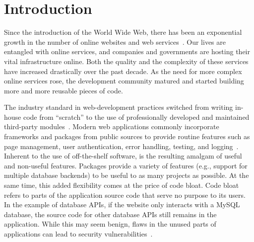 \section{Introduction}

Since the introduction of the World Wide Web, there has been an exponential growth in the number of online websites and web services~\cite{websitestatistics}. 
Our lives are entangled with online services, and companies and governments are hosting their vital infrastructure online. 
Both the quality and the complexity of these services have increased drastically over the past decade. 
As the need for more complex online services rose, the development community matured and started building more and more reusable pieces of code. 


The industry standard in web-development practices switched from writing in-house code from ``scratch'' to the use of professionally developed and maintained third-party modules~\cite{packagiststats, npmstatistics, pypi}. 
Modern web applications commonly incorporate frameworks and packages from public sources to provide routine features such as page management, user authentication, error handling, testing, and logging~\cite{popularphp}. 
Inherent to the use of off-the-shelf software, is the resulting amalgam of useful and non-useful features. 
Packages provide a variety of features (e.g., support for multiple database backends) to be useful to as many projects as possible.
At the same time, this added flexibility comes at the price of code bloat. 
Code bloat refers to parts of the application source code that serve no purpose to its users. 
In the example of database APIs, if the website only interacts with a MySQL database, the source code for other database APIs still remains in the application. 
While this may seem benign, flaws in the unused parts of applications can lead to security vulnerabilities~\cite{lessismore, saphire}. 

